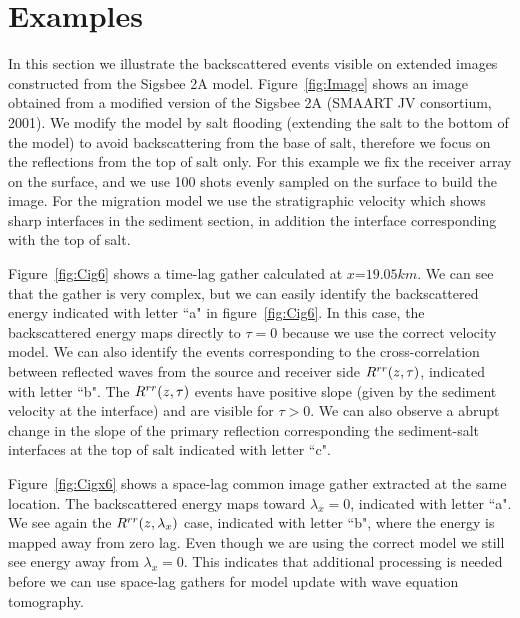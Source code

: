


\section{Examples}

In this section we illustrate the backscattered events visible on extended images constructed from the Sigsbee 2A model.
 Figure~\ref{fig:Image} shows an image obtained from  a modified
version of the Sigsbee 2A (SMAART JV consortium, 2001). We modify the model by salt flooding (extending the salt to the bottom
of the model) to avoid backscattering from the base 
of salt, therefore we focus on the reflections from the top of salt only. For this example we fix the receiver array on 
the surface, and we use 100 shots evenly sampled on the surface to build 
the image. For the migration model we use the stratigraphic
velocity which shows sharp interfaces in the sediment section, in addition the interface corresponding with the top of salt.

Figure~\ref{fig:Cig6} shows a time-lag gather calculated at $x$=$19.05km$.
We can see that the gather is very complex, but we can easily identify the backscattered energy indicated with letter ``a" in figure~\ref{fig:Cig6}.
 In this case, the backscattered energy maps directly to $\tau=0$ because we use the correct velocity model.
We can also identify the events corresponding to the cross-correlation between reflected waves from the source and receiver side $R^{rr}(z,\tau)$, indicated
with letter ``b". The $R^{rr}(z,\tau)$ events have positive slope (given by the sediment velocity at the interface) and are 
visible for $\tau>0$. We can also observe a abrupt change
in the slope of the primary reflection corresponding the sediment-salt interfaces at the top of salt indicated with letter ``c".

Figure~\ref{fig:Cigx6} shows a space-lag common image gather extracted at the same location. The backscattered energy maps toward $\lambda_x=0$, indicated with 
letter ``a". We see again the $R^{rr}(z,\lambda_x)$ case, indicated with letter ``b", where the energy is mapped away from zero lag.  
Even though we are using the correct model we still see energy away from $\lambda_x=0$. This indicates that additional processing is needed before 
we can use space-lag gathers for model update with wave equation tomography.

